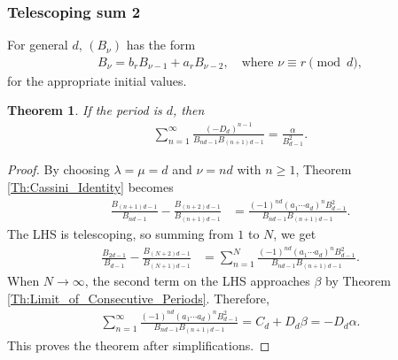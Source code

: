 \documentclass[12pt]{article}
\theoremstyle{plain}
\newtheorem{theorem}{Theorem}
\theoremstyle{definition}
\theoremstyle{remark}
\begin{document}
\subsubsection{Telescoping sum 2}

For general $ d $, $ (B_\nu) $ has the form
\begin{align*}
	B_\nu = b_r B_{\nu - 1} + a_r B_{\nu - 2}, \quad \text{where } \nu \equiv r \pmod{d},
\end{align*}
for the appropriate initial values. 

\begin{theorem} If the period is $ d $, then
\begin{align*}
	\sum_{n = 1}^\infty \frac{(-D_d)^{n - 1}}{B_{nd - 1} B_{(n + 1)d - 1}} = \frac{\alpha}{B_{d - 1}^2}.
\end{align*}
\end{theorem}

\begin{proof} By choosing $ \lambda = \mu = d $ and $ \nu = nd $ with $ n \geq 1 $, Theorem \ref{Th:Cassini_Identity} becomes
\begin{align*}
	\frac{B_{(n + 1)d - 1}}{B_{nd - 1}} - \frac{B_{(n + 2)d - 1}}{B_{(n + 1)d - 1}} &= \frac{(-1)^{nd} (a_1 \cdots a_d)^n B_{d - 1}^2}{B_{nd - 1} B_{(n + 1)d - 1}}.
\end{align*}
The LHS is telescoping, so summing from $ 1 $ to $ N $, we get
\begin{align*}
	\frac{B_{2d - 1}}{B_{d - 1}} - \frac{B_{(N + 2)d - 1}}{B_{(N + 1)d - 1}}  &= \sum_{n = 1}^N \frac{(-1)^{nd} (a_1 \cdots a_d)^n B_{d - 1}^2}{B_{nd - 1} B_{(n + 1)d - 1}}.
\end{align*}
When $ N \longrightarrow \infty $, the second term on the LHS approaches $ \beta $ by Theorem \ref{Th:Limit_of_Consecutive_Periods}. Therefore, 
\begin{align*}
	\sum_{n = 1}^\infty \frac{(-1)^{nd} (a_1 \cdots a_d)^n B_{d - 1}^2}{B_{nd - 1} B_{(n + 1)d - 1}} = C_d + D_d \beta = -D_d \alpha.
\end{align*}
This proves the theorem after simplifications.
\end{proof}
\end{document}
